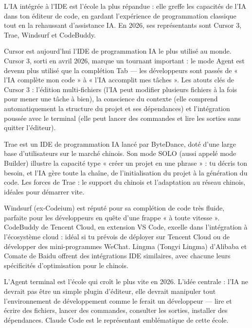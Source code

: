 
L'IA intégrée à l'IDE est l'école la plus répandue : elle greffe les capacités de l'IA dans ton éditeur de code, en gardant l'expérience de programmation classique tout en la rehaussant d'assistance IA. En 2026, ses représentants sont Cursor 3, Trae, Windsurf et CodeBuddy.


Cursor est aujourd'hui l'IDE de programmation IA le plus utilisé au monde. Cursor 3, sorti en avril 2026, marque un tournant important : le mode Agent est devenu plus utilisé que la complétion Tab — les développeurs sont passés de « l'IA complète mon code » à « l'IA accomplit mes tâches ». Les atouts clés de Cursor 3 : l'édition multi-fichiers (l'IA peut modifier plusieurs fichiers à la fois pour mener une tâche à bien), la conscience du contexte (elle comprend automatiquement la structure du projet et ses dépendances) et l'intégration poussée avec le terminal (elle peut lancer des commandes et lire les sorties sans quitter l'éditeur).


Trae est un IDE de programmation IA lancé par ByteDance, doté d'une large base d'utilisateurs sur le marché chinois. Son mode SOLO (aussi appelé mode Builder) illustre la capacité type « créer un projet en une phrase » : tu décris ton besoin, et l'IA gère toute la chaîne, de l'initialisation du projet à la génération du code. Les forces de Trae : le support du chinois et l'adaptation au réseau chinois, idéales pour démarrer vite.


Windsurf (ex-Codeium) est réputé pour sa complétion de code très fluide, parfaite pour les développeurs en quête d'une frappe « à toute vitesse ». CodeBuddy de Tencent Cloud, en extension VS Code, excelle dans l'intégration à l'écosystème cloud : idéal si tu prévois de déployer sur Tencent Cloud ou de développer des mini-programmes WeChat. Lingma (Tongyi Lingma) d'Alibaba et Comate de Baidu offrent des intégrations IDE similaires, avec chacune leurs spécificités d'optimisation pour le chinois.


L'Agent terminal est l'école qui croît le plus vite en 2026. L'idée centrale : l'IA ne devrait pas être un simple plugin d'éditeur, elle devrait manipuler tout l'environnement de développement comme le ferait un développeur — lire et écrire des fichiers, lancer des commandes, consulter les sorties, installer des dépendances. Claude Code est le représentant emblématique de cette école.

